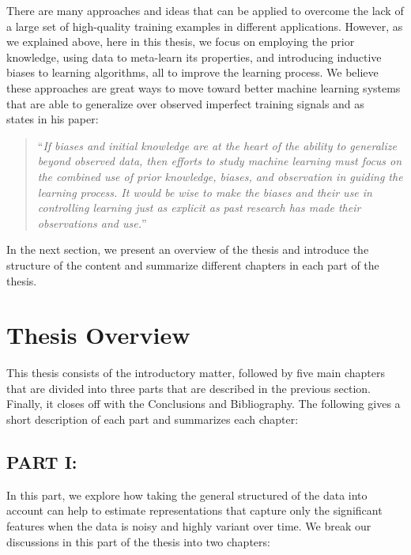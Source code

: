 There are many approaches and ideas that can be applied to overcome the lack of a large set of high-quality training examples in different applications. However, as we explained above, here in this thesis, we focus on employing the prior knowledge, using data to meta-learn its properties, and introducing inductive biases to learning algorithms, all to improve the learning process. We believe these approaches are great ways to move toward better machine learning systems that are able to generalize over observed imperfect training signals and as ~\citet{Mitchell80theneed} states in his paper:
\begin{quote}
``\emph{If biases and initial knowledge are at the heart of the ability to generalize beyond observed data, then efforts to study machine learning must focus on the combined use of prior knowledge, biases, and observation in guiding the learning process. It would be wise to make the biases and their use in controlling learning just as explicit as past research has made their observations and use.}''
\end{quote}

In the next section, we present an overview of the thesis and introduce the structure of the content and summarize different chapters in each part of the thesis.

\section{Thesis Overview}
This thesis consists of the introductory matter, followed by five main
chapters that are divided into three parts that are described in the previous section. Finally, it closes off with the Conclusions and Bibliography. 
The following gives a short description of each part and summarizes each chapter: 

\subsection*{PART I: }
In this part, we explore how taking the general structured of the data into account can help to estimate representations that capture only the significant features when the data is noisy and highly variant over time. We break our discussions in this part of the thesis into two chapters:

